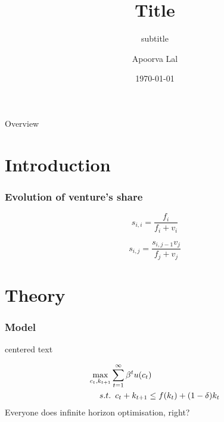 \documentclass[12pt, aspectratio=169]{beamer}
\begin{document}



\title{Title}
\subtitle{subtitle}

\author{Apoorva Lal}

\date{\today}

\frame{\titlepage}


\begin{frame}{Overview}
\tableofcontents
\end{frame}



\section{Introduction}
\begin{frame}
\frametitle{Evolution of venture's share}

$$
s_{i,i}=\frac{f_i}{f_i+v_i}
$$

$$
s_{i,j}=\frac{s_{i,j-1}v_j}{f_j+v_j}
$$

\end{frame}


\section{Theory}
\begin{frame}[t]\frametitle{Model}
\begin{center}
centered text
\end{center}

\begin{align*}
\maxi_{c_t,k_{t+1}} &  \sum_{t=1}^{\infty} \beta^t u(c_t)  \\
  s.t. & \enspace c_{t} + k_{t+1} \leq f(k_t) + (1-\delta)k_t
\end{align*}
Everyone does infinite horizon optimisation, right?
\end{frame}
\end{document}
